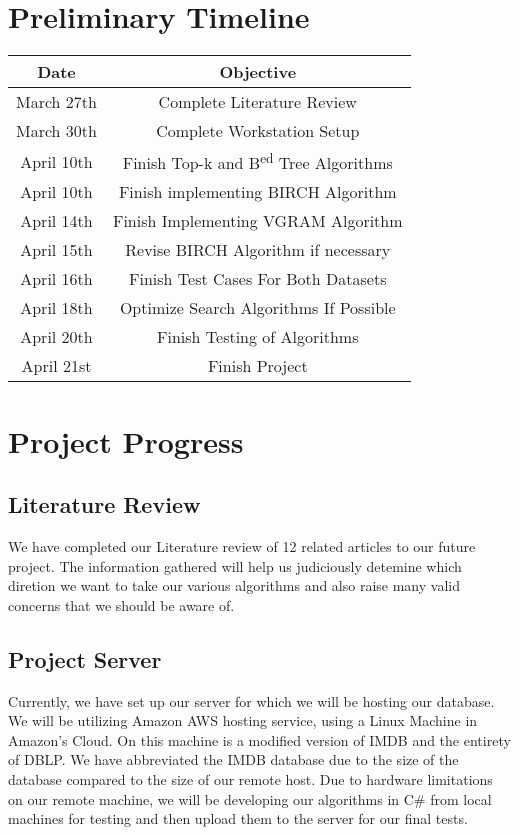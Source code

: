 \documentclass[pdftex,12pt,letter]{article}
\begin{document}
\section{Preliminary Timeline}
\begin{tabular} {| c | c |}
\hline
\bf{Date} & \bf{Objective}\\ \hline
March 27th & Complete Literature Review\\ \hline
March 30th & Complete Workstation Setup\\ \hline
April 10th & Finish Top-k and B\textsuperscript{ed} Tree Algorithms\\ \hline
April 10th & Finish implementing BIRCH Algorithm \\ \hline
April 14th & Finish Implementing VGRAM Algorithm\\ \hline
April 15th & Revise BIRCH Algorithm if necessary\\ \hline
April 16th & Finish Test Cases For Both Datasets\\ \hline
April 18th & Optimize Search Algorithms If Possible\\ \hline
April 20th & Finish Testing of Algorithms\\ \hline
April 21st & Finish Project\\ \hline
\end{tabular}

\section{Project Progress}
\subsection{Literature Review}
We have completed our Literature review of 12 related articles to our future project. The information gathered will help us judiciously detemine which diretion we want to take our various algorithms and also raise many valid concerns that we should be aware of. 
\subsection{Project Server}
Currently, we have set up our server for which we will be hosting our database. We will be utilizing Amazon AWS hosting service, using a Linux Machine in Amazon's Cloud. On this machine is a modified version of IMDB and the entirety of DBLP. We have abbreviated the IMDB database due to the size of the database compared to the size of our remote host. Due to hardware limitations on our remote machine, we will be developing our algorithms in C\# from local machines for testing and then upload them to the server for our final tests.
\end{document}
